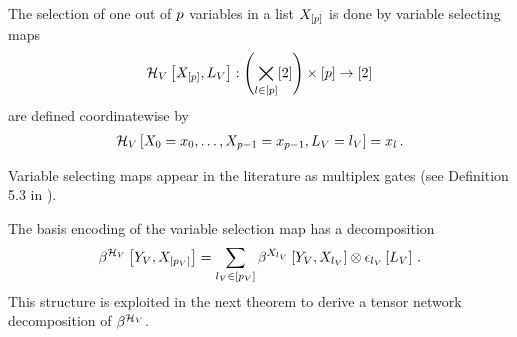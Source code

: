 

\begin{definition}\label{def:variableSelector}
	The selection of one out of $p$ variables in a list $X_{[p]}$ is done by variable selecting maps
	\begin{align}
		\mathcal{H}_{V}\left[X_{[p]},L_{V}\right]:  \left(\bigtimes_{l\in[p]}[2]\right) \times [p]  \rightarrow [2]
	\end{align}
	are defined coordinatewise by
	\begin{align}
		\mathcal{H}_{V}\left[X_{0}=x_{0},\ldots,X_{p-1}=x_{p-1},L_{V}=l_{V}\right] = x_{l} \, .
	\end{align}
\end{definition}
	
Variable selecting maps appear in the literature as multiplex gates (see Definition 5.3 in \cite{koller_probabilistic_2009}).

The basis encoding of the variable selection map has a decomposition
\begin{align*}
	\beta^{\mathcal{H}_{V}}\left[Y_{V},X_{[p_{V}]}\right]
	= \sum_{l_{V}\in[p_{V}]} 
	\beta^{X_{l_{V}}}\left[Y_{V},X_{l_{V}}\right] \otimes  \epsilon_{l_{V}}\left[L_{V}\right] \, .
\end{align*}
This structure is exploited in the next theorem to derive a tensor network decomposition of $\beta^{\mathcal{H}_{V}}$.

